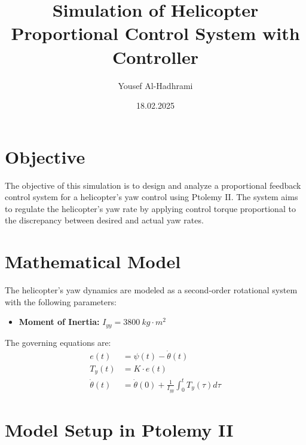 \documentclass{article}
\title{Simulation of Helicopter Proportional Control System with Controller}
\author{Yousef Al-Hadhrami}
\date{18.02.2025}
\begin{document}
\maketitle

\section{Objective}
The objective of this simulation is to design and analyze a proportional feedback control system for a helicopter's yaw control using Ptolemy II. The system aims to regulate the helicopter’s yaw rate by applying control torque proportional to the discrepancy between desired and actual yaw rates.

\section{Mathematical Model}
The helicopter's yaw dynamics are modeled as a second-order rotational system with the following parameters:
\begin{itemize}
    \item \textbf{Moment of Inertia:} $I_{yy} = 3800 \ kg \cdot m^2$
\end{itemize}

The governing equations are:
\begin{align}
    e(t) &= \psi(t) - \dot{\theta}(t) \\
    T_y(t) &= K \cdot e(t) \\
    \dot{\theta}(t) &= \dot{\theta}(0) + \frac{1}{I_{yy}} \int_0^t T_y(\tau) d\tau
\end{align}

\section{Model Setup in Ptolemy II}
\end{document}
